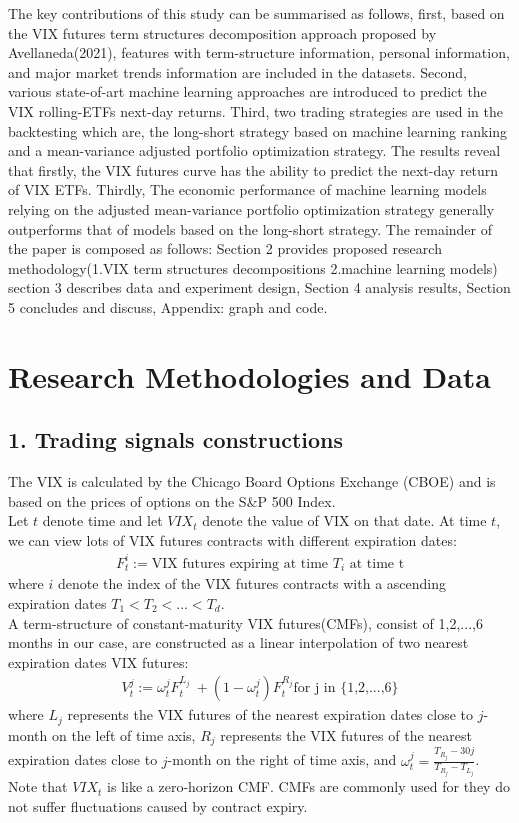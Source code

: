 \documentclass[10pt,letterpaper]{article}
\begin{document}
The key contributions of this study can be summarised as follows, first, based on the VIX futures term structures decomposition approach proposed by Avellaneda(2021), features with term-structure information, personal information, and major market trends information are included in the datasets. Second, various state-of-art machine learning approaches are introduced to predict the VIX rolling-ETFs next-day returns. Third, two trading strategies are used in the backtesting which are, the long-short strategy based on machine learning ranking and a mean-variance adjusted portfolio optimization strategy.
The results reveal that firstly, the VIX futures curve has the ability to predict the next-day return of VIX ETFs. Thirdly, The economic performance of machine learning models relying on the adjusted mean-variance portfolio optimization strategy generally outperforms that of models based on the long-short strategy. The remainder of the paper is composed as follows: Section 2 provides proposed research methodology(1.VIX term structures decompositions 2.machine learning models) section 3 describes data and experiment design, Section 4 analysis results, Section 5 concludes and discuss, Appendix: graph and code.



\section*{Research Methodologies and Data}
\subsection*{1. Trading signals constructions}
The VIX is calculated by the Chicago Board Options Exchange (CBOE) and is based on the prices of options on the S\&P 500 Index.
\\Let $t$ denote time and let $VIX_t$ denote the value of VIX on that date. At time $t$,
we can view lots of VIX futures contracts with different expiration dates:
\begin{eqnarray}
    {F^i_t} := \text{VIX futures expiring at time $T_i$ at time t}
\end{eqnarray}
where $i$ denote the index of the VIX futures contracts with a ascending expiration dates $T_1 < T_2 < ... < T_d$.
\\A term-structure of constant-maturity VIX futures(CMFs), consist of 1,2,...,6 months in our case, are constructed as
a linear interpolation of two nearest expiration dates VIX futures:
\begin{eqnarray}
\label{eq:defineV}
    {V^j_t} := \omega^j_tF^{L_j}_t\ + (1 - \omega^j_t)F^{R_j}_t \text{for j in \{1,2,...,6\}}
\end{eqnarray}
where $L_j$ represents the VIX futures of the nearest expiration dates close to $j$-month on the left of time axis,
$R_j$ represents the VIX futures of the nearest expiration dates close to $j$-month on the right of time axis, and
$\omega^j_t = \frac{T_{R_j} - 30j}{T_{R_j} - T_{L_j}}$. Note that $VIX_t$ is like a zero-horizon CMF.
CMFs are commonly used for they do not suffer fluctuations caused by contract expiry.
\end{document}
